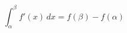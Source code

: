 \documentclass{article}
\begin{document}
\begin{equation}
    \int_\alpha^\beta f'(x) \, dx=f(\beta)-f(\alpha)
\end{equation}
\end{document}
